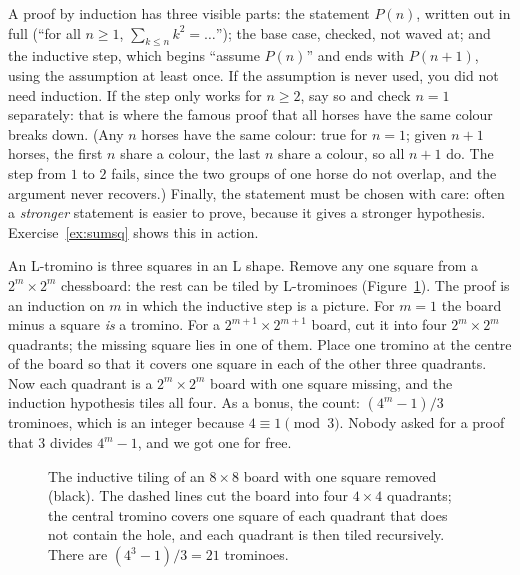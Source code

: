 \begin{reminder}
A proof by induction has three visible parts: the statement $P(n)$, written out in full (``for all $n\ge1$, $\sum_{k\le n}k^2=\dots$''); the base
case, checked, not waved at; and the inductive step, which begins ``assume $P(n)$'' and ends with $P(n+1)$, using the assumption at least once. If
the assumption is never used, you did not need induction. If the step only works for $n\ge2$, say so and check $n=1$ separately: that is where the
famous proof that all horses have the same colour breaks down. (Any $n$ horses have the same colour: true for $n=1$; given $n+1$ horses, the first $n$
share a colour, the last $n$ share a colour, so all $n+1$ do. The step from $1$ to $2$ fails, since the two groups of one horse do not overlap, and
the argument never recovers.) Finally, the statement must be chosen with care: often a \emph{stronger} statement is easier to prove, because it gives a
stronger hypothesis. Exercise~\ref{ex:sumsq} shows this in action.
\end{reminder}

\begin{examplex}
An L-tromino is three squares in an L shape. Remove any one square from a $2^m\times2^m$ chessboard: the rest can be tiled by L-trominoes
(Figure~\ref{fig:tromino}). The proof is an induction on $m$ in which the inductive step is a picture. For $m=1$ the board minus a square \emph{is}
a tromino. For a $2^{m+1}\times2^{m+1}$ board, cut it into four $2^m\times2^m$ quadrants; the missing square lies in one of them. Place one tromino
at the centre of the board so that it covers one square in each of the other three quadrants. Now each quadrant is a $2^m\times2^m$ board with one
square missing, and the induction hypothesis tiles all four. As a bonus, the count: $(4^m-1)/3$ trominoes, which is an integer because $4\equiv1\pmod3$.
Nobody asked for a proof that $3$ divides $4^m-1$, and we got one for free.
\end{examplex}

\begin{figure}[ht]
\centering
{}
\caption{The inductive tiling of an $8\times8$ board with one square removed (black). The dashed lines cut the board into four $4\times4$ quadrants; the central tromino covers one square of each quadrant that does not contain the hole, and each quadrant is then tiled recursively. There are $(4^3-1)/3=21$ trominoes.}
\label{fig:tromino}
\end{figure}

